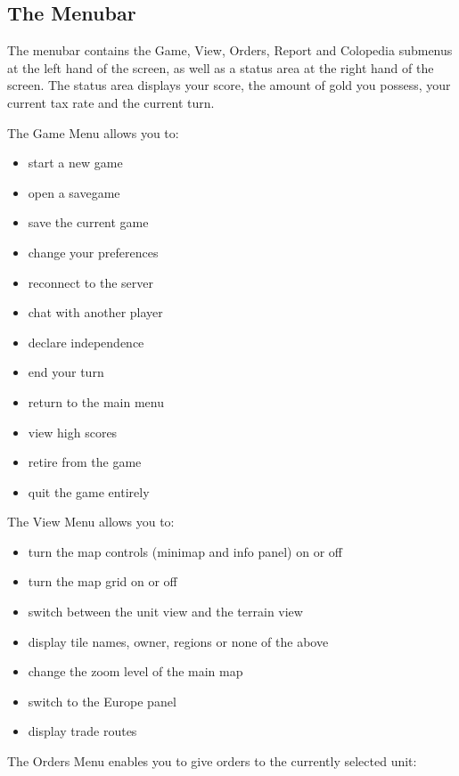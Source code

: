 \documentclass[12pt]{book}
\begin{document}
\hypertarget{menubar}{\subsection{The Menubar}}

The menubar contains the Game, View, Orders, Report and Colopedia
submenus at the left hand of the screen, as well as a status area at
the right hand of the screen. The status area displays your score, the
amount of gold you possess, your current tax rate and the current
turn.

The \hypertarget{game menu}{Game Menu} allows you to:

\begin{itemize}
\item start a new game 
\item open a savegame
\item save the current game
\item change your preferences
\item reconnect to the server
\item chat with another player
\item declare independence
\item end your turn
\item return to the main menu
\item view high scores
\item retire from the game
\item quit the game entirely
\end{itemize}

The \hypertarget{view menu}{View Menu} allows you to:

\begin{itemize}
\item turn the map controls (minimap and info panel) on or off
\item turn the map grid on or off
\item switch between the unit view and the terrain view
\item display tile names, owner, regions or none of the above
\item change the zoom level of the main map
\item switch to the Europe panel
\item display trade routes
\end{itemize}

The \hypertarget{orders menu}{Orders Menu} enables you to give orders
to the currently selected unit:
\end{document}
